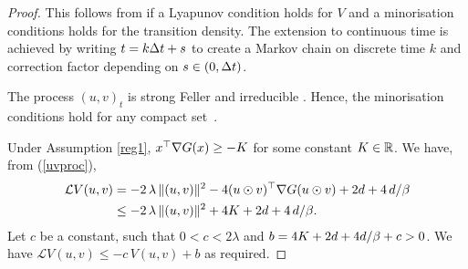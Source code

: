 \documentclass[11pt, twoside]{report}
\begin{document}
\begin{proof} This follows from \cite[Theorem 2.25]{Lelievre2016-hx} if  a Lyapunov condition holds for $V$  and a minorisation conditions holds for the transition density. The extension to continuous time  \cite[Equation 2.77]{Lelievre2016-hx} is achieved by writing $t=k {\Delta t} +s$ to create a  Markov chain on discrete time $k$ and correction factor depending on $s\in(0,{\Delta t})$.

The process $(u,v)_t$ is strong Feller and irreducible \cite[Theorem 3.1]{2025hadalangsamp}. Hence,  the minorisation conditions hold for any compact set~\cite[Lemma 2.3]{mattingly2002ergodicity}. 

 Under Assumption \ref{reg1},  $x^\top \nabla G(x) \ge -K $ for some constant $K \in \mathbb{R}$.   We have, from (\ref{uvproc}),
    \begin{align*}
    \mathcal L V(u,v) 
    &= -2\,\lambda\,\|(u,v)\|^2  - 4(u \odot v)^\top \nabla G(u \odot v) + 2d+4\,d/\beta\\&
    \leq -2\,\lambda\,\|(u,v)\|^2  +4K+ 2d+4\,d/\beta.\end{align*}
    Let $c$ be a constant, such that $0 < c < 2\lambda$ and $b=4K+2d+4d/\beta  + c > 0$. We  have $\mathcal L V(u,v) \leq -c\,V(u,v) + b$ as required. 
\end{proof}
\end{document}
